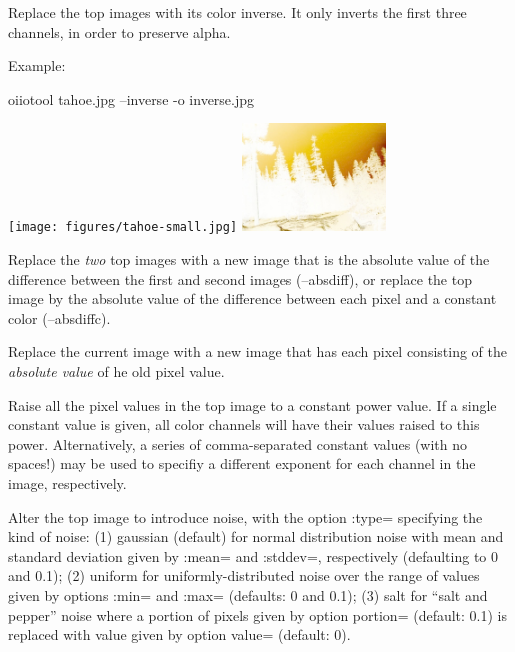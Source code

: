 Replace the top images with its color inverse. It only inverts the first
three channels, in order to preserve alpha.

\noindent Example:
\begin{code}
   oiiotool tahoe.jpg --inverse -o inverse.jpg
\end{code}
\spc \texttt{[image: figures/tahoe-small.jpg]}
\raisebox{40pt}{\large $\rightarrow$}
\includegraphics[width=1.5in]{figures/invert.jpg} \\
\apiend


Replace the \emph{two} top images with a new image that is the absolute
value of the difference between the first and second images ({\cf --absdiff}),
or replace the top image by the absolute value of the difference between each
pixel and a constant color ({\cf --absdiffc}).
\apiend

Replace the current image with a new image that has each pixel
consisting of the \emph{absolute value} of he old pixel value.
\apiend

Raise all the pixel values in the top image to a constant power value.
If a single constant value is given, all color channels will have their values
raised to this power.  Alternatively, a series of
comma-separated constant values (with no spaces!) may be used to specifiy a
different exponent for each channel in the image, respectively.
\apiend

Alter the top image to introduce noise, with the option {\cf :type=}
specifying the kind of noise: (1) {\cf gaussian} (default) for normal
distribution noise with mean and standard deviation given by {\cf :mean=}
and {\cf :stddev=}, respectively (defaulting to 0 and 0.1); (2) {\cf
uniform} for uniformly-distributed noise over the range of values given by
options {\cf :min=} and {\cf :max=} (defaults: 0 and 0.1); (3) {\cf salt}
for ``salt and pepper'' noise where a portion of pixels given by  option
{\cf portion=} (default: 0.1) is replaced with value given by option {\cf
value=} (default: 0).

